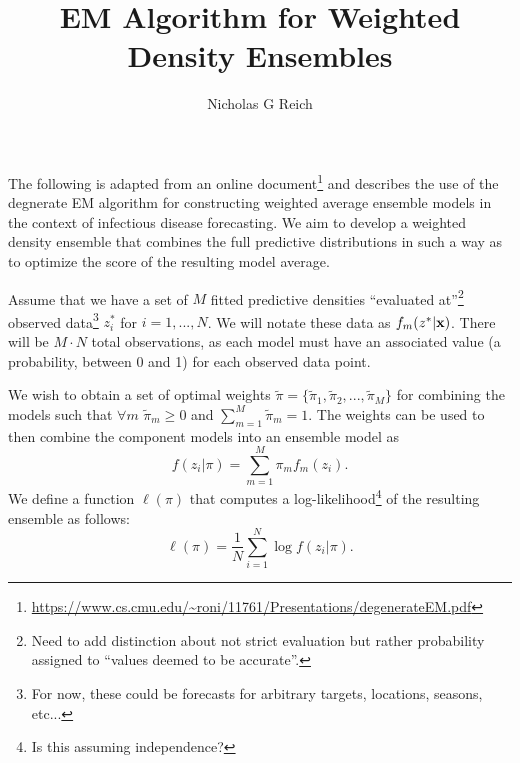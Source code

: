 \documentclass{article}
\title{EM Algorithm for Weighted Density Ensembles}
\author{Nicholas G Reich}
\begin{document}
\maketitle

The following is adapted from an online document\footnote{\url{https://www.cs.cmu.edu/~roni/11761/Presentations/degenerateEM.pdf}} and describes the use of the degnerate EM algorithm for constructing weighted average ensemble models in the context of infectious disease forecasting.  
We aim to develop a weighted density ensemble that combines the full predictive distributions in such a way as to optimize the score of the resulting model average.

Assume that we have a set of $M$ fitted predictive densities ``evaluated at''\footnote{Need to add distinction about not strict evaluation but rather probability assigned to ``values deemed to be accurate''.} observed data\footnote{For now, these could be forecasts for arbitrary targets, locations, seasons, etc... } $z_i^*$ for $i=1, ..., N$. We will notate these data as  $f_{m}(z^*|{\bf x})$. There will be $M\cdot N$ total observations, as each model must have an associated value (a probability, between 0 and 1) for each observed data point.

We wish to obtain a set of optimal weights $\tilde\pi = \{\tilde\pi_1, \tilde\pi_2, ..., \tilde\pi_M\}$ for combining the models such that $\forall m$ $\tilde\pi_m \geq 0$ and $\sum_{m=1}^M \tilde\pi_m=1$.
The weights can be used to then combine the component models into an ensemble model as
$$f(z_i|\pi) = \sum_{m=1}^M \pi_m f_m(z_i).$$
We define a function $\ell(\pi)$ that computes a log-likelihood\footnote{Is this assuming independence?} of the resulting ensemble as follows:
$$\ell(\pi) = \frac{1}{N}\sum_{i=1}^N \log f(z_i|\pi).$$
\end{document}
